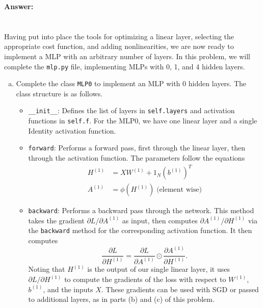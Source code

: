\documentclass{article}[12pt]
\begin{document}
\textbf{Answer:}\\



\clearpage
\section{}

Having put into place the tools for optimizing a linear layer, selecting the appropriate cost function, and adding nonlinearities, we are now ready to implement a MLP with an arbitrary number of layers. In this problem, we will complete the \texttt{mlp.py} file, implementing MLPs with 0, 1, and 4 hidden layers.

\begin{enumerate}[(a)]
    \item Complete the class \texttt{MLP0} to implement an MLP with 0 hidden layers. The class structure is as follows.
        \begin{itemize}
            \item \texttt{\_\_init\_\_}: Defines the list of layers in \texttt{self.layers} and activation functions in \texttt{self.f}. For the MLP0, we have one linear layer and a single Identity activation function.
            \item \texttt{forward}: Performs a forward pass, first through the linear layer, then through the activation function. The parameters follow the equations
                \begin{align*}
                    H^{(1)} &= X W^{(1)} + 1_{N} (b^{(1)})^{T} \\
                    A^{(1)} &= \phi\left( H^{(1)} \right) \; \text{(element wise)}
                \end{align*}
            \item \texttt{backward}: Performs a backward pass through the network. This method takes the gradient $\partial L / \partial A^{(1)}$ as input, then computes $\partial A^{(1)} / \partial H^{(1)}$ via the \texttt{backward} method for the corresponding activation function. It then computes
                \begin{equation*}
                    \frac{\partial L}{\partial H^{(1)}} = \frac{\partial L}{\partial A^{(1)}} \odot \frac{\partial A^{(1)}}{\partial H^{(1)}}.
                \end{equation*}
                Noting that $H^{(1)}$ is the output of our single linear layer, it uses $\partial L / \partial H^{(1)}$ to compute the gradients of the loss with respect to $W^{(1)}$, $b^{(1)}$, and the inputs $X$. These gradients can be used with SGD or passed to additional layers, as in parts (b) and (c) of this problem.

\end{itemize}
\end{enumerate}
\end{document}
